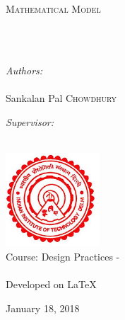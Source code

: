 \documentclass[
11pt, %
english, %
singlespacing, %
headsepline, %
]{MastersDoctoralThesis} %
\author{Shreshth \textsc{Tuli}} %
\begin{document}
\frontmatter %

\pagestyle{plain} %


\begin{titlepage}
\begin{center}

\vspace*{.06\textheight}
{\scshape\LARGE \univname\par}\vspace{1.5cm} %
\textsc{\Large Mathematical Model}\\[0.5cm] %

\HRule \\[0.4cm] %
{\huge \bfseries \ttitle\par}\vspace{0.4cm} %
\HRule \\[1.5cm] %
 
\begin{minipage}[t]{0.4\textwidth}
\begin{flushleft} \large
\emph{Authors:}\\
\authorname\\
Sankalan Pal \textsc{Chowdhury}
\end{flushleft}
\end{minipage}
\begin{minipage}[t]{0.4\textwidth}
\begin{flushright} \large
\emph{Supervisor:} \\
\href{http://www.cse.iitd.ernet.in/~suban/}{\supname} %
\end{flushright}
\end{minipage}\\[3cm]
 
\includegraphics[width=100pt]{logo} \\
\vfill
Course: Design Practices - \groupname\\\deptname\\[2cm] %
Developed on \LaTeX
 
\vfill

{\large January 18, 2018}\\[4cm] %
 
\vfill
\end{center}
\end{titlepage}
\end{document}
